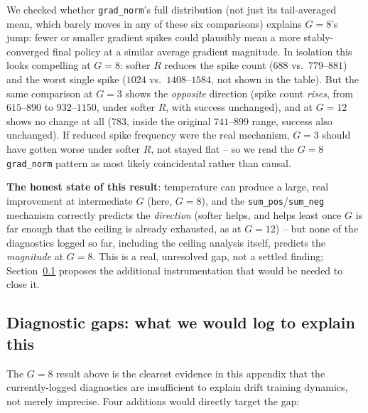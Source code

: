 \documentclass[11pt]{article}
\begin{document}
We checked whether \texttt{grad\_norm}'s full distribution (not just its
tail-averaged mean, which barely moves in any of these six comparisons)
explains $G=8$'s jump: fewer or smaller gradient spikes could plausibly
mean a more stably-converged final policy at a similar average gradient
magnitude. In isolation this looks compelling at $G=8$: softer $R$
reduces the spike count ($688$ vs.\ $779$--$881$) and the worst single
spike ($1024$ vs.\ $1408$--$1584$, not shown in the table). But the same
comparison at $G=3$ shows the \emph{opposite} direction (spike count
\emph{rises}, from $615$--$890$ to $932$--$1150$, under softer $R$, with
success unchanged), and at $G=12$ shows no change at all ($783$, inside
the original $741$--$899$ range, success also unchanged). If reduced
spike frequency were the real mechanism, $G=3$ should have gotten worse
under softer $R$, not stayed flat -- so we read the $G=8$
\texttt{grad\_norm} pattern as most likely coincidental rather than
causal.

\textbf{The honest state of this result}: temperature can produce a
large, real improvement at intermediate $G$ (here, $G=8$), and the
\texttt{sum\_pos}/\texttt{sum\_neg} mechanism correctly predicts the
\emph{direction} (softer helps, and helps least once $G$ is far enough
that the ceiling is already exhausted, as at $G=12$) -- but none of the
diagnostics logged so far, including the ceiling analysis itself,
predicts the \emph{magnitude} at $G=8$. This is a real, unresolved gap,
not a settled finding; Section~\ref{sec:diagnostic_gaps} proposes the
additional instrumentation that would be needed to close it.

\subsection{Diagnostic gaps: what we would log to explain this}
\label{sec:diagnostic_gaps}

The $G=8$ result above is the clearest evidence in this appendix that
the currently-logged diagnostics are insufficient to explain drift
training dynamics, not merely imprecise. Four additions would directly
target the gap:
\end{document}
